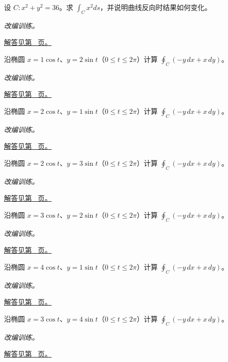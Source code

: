 \documentclass[UTF8,12pt,a4paper,fontset=fandol]{ctexart}
\begin{document}
\begin{example}[圆上的第一类曲线积分]\label{ex:c41q7}
设 $C:x^2+y^2=36$。求 $\displaystyle\int_Cx^2ds$，并说明曲线反向时结果如何变化。
\par\textit{改编训练。}\par\hyperref[ans:c41q7]{解答见第~\pageref{ans:c41q7} 页。}
\end{example}
\begin{example}[椭圆上的环流]\label{ex:c41q8}
沿椭圆 $x=1\cos t$、$y=2\sin t$（$0\le t\le2\pi$）计算 $\oint_C(-y\,dx+x\,dy)$。
\par\textit{改编训练。}\par\hyperref[ans:c41q8]{解答见第~\pageref{ans:c41q8} 页。}
\end{example}
\begin{example}[椭圆上的环流]\label{ex:c41q9}
沿椭圆 $x=2\cos t$、$y=1\sin t$（$0\le t\le2\pi$）计算 $\oint_C(-y\,dx+x\,dy)$。
\par\textit{改编训练。}\par\hyperref[ans:c41q9]{解答见第~\pageref{ans:c41q9} 页。}
\end{example}
\begin{example}[椭圆上的环流]\label{ex:c41q10}
沿椭圆 $x=2\cos t$、$y=3\sin t$（$0\le t\le2\pi$）计算 $\oint_C(-y\,dx+x\,dy)$。
\par\textit{改编训练。}\par\hyperref[ans:c41q10]{解答见第~\pageref{ans:c41q10} 页。}
\end{example}
\begin{example}[椭圆上的环流]\label{ex:c41q11}
沿椭圆 $x=3\cos t$、$y=2\sin t$（$0\le t\le2\pi$）计算 $\oint_C(-y\,dx+x\,dy)$。
\par\textit{改编训练。}\par\hyperref[ans:c41q11]{解答见第~\pageref{ans:c41q11} 页。}
\end{example}
\begin{example}[椭圆上的环流]\label{ex:c41q12}
沿椭圆 $x=4\cos t$、$y=1\sin t$（$0\le t\le2\pi$）计算 $\oint_C(-y\,dx+x\,dy)$。
\par\textit{改编训练。}\par\hyperref[ans:c41q12]{解答见第~\pageref{ans:c41q12} 页。}
\end{example}
\begin{example}[椭圆上的环流]\label{ex:c41q13}
沿椭圆 $x=3\cos t$、$y=4\sin t$（$0\le t\le2\pi$）计算 $\oint_C(-y\,dx+x\,dy)$。
\par\textit{改编训练。}\par\hyperref[ans:c41q13]{解答见第~\pageref{ans:c41q13} 页。}
\end{example}
\end{document}
